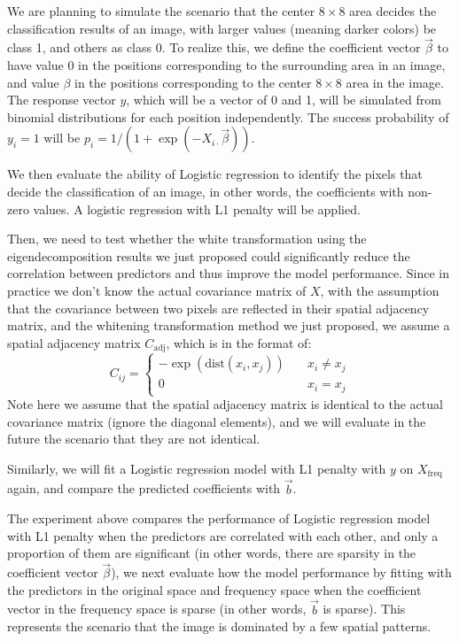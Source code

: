 \documentclass[12pt]{article}
\begin{document}
We are planning to simulate the scenario that the center \( 8 \times 8 \) area decides the classification results of an image, with larger values (meaning darker colors) be class 1, and others as class 0. To realize this, we define the coefficient vector \( \vec{\beta} \) to have value 0 in the positions corresponding to the surrounding area in an image, and value \( \beta \) in the positions corresponding to the center \( 8 \times 8 \) area in the image. The response vector \( y \), which will be a vector of 0 and 1, will be simulated from binomial distributions for each position independently. The success probability of \( y_i = 1 \) will be \( p_i = 1 / (1 + \exp (- X_{i \cdot} \vec{\beta})) \).

We then evaluate the ability of Logistic regression to identify the pixels that decide the classification of an image, in other words, the coefficients with non-zero values. A logistic regression with L1 penalty will be applied.

Then, we need to test whether the white transformation using the eigendecomposition results we just proposed could significantly reduce the correlation between predictors and thus improve the model performance. Since in practice we don't know the actual covariance matrix of \( X \), with the assumption that the covariance between two pixels are reflected in their spatial adjacency matrix, and the whitening transformation method we just proposed, we assume a spatial adjacency matrix \( C_{\text{adj}} \), which is in the format of:
\[
  C_{ij} = 
  \begin{cases}
    - \exp (\text{dist} (x_i, x_j))  & \quad x_i \neq x_j \\
    0                                & \quad x_i = x_j
  \end{cases}
\]
Note here we assume that the spatial adjacency matrix is identical to the actual covariance matrix (ignore the diagonal elements), and we will evaluate in the future the scenario that they are not identical.



Similarly, we will fit a Logistic regression model with L1 penalty with \( y \) on \( X_{\text{freq}} \) again, and compare the predicted coefficients with \( \vec{b} \).

The experiment above compares the performance of Logistic regression model with L1 penalty when the predictors are correlated with each other, and only a proportion of them are significant (in other words, there are sparsity in the coefficient vector \( \vec{\beta} \)), we next evaluate how the model performance by fitting with the predictors in the original space and frequency space when the coefficient vector in the frequency space is sparse (in other words, \( \vec{b} \) is sparse). This represents the scenario that the image is dominated by a few spatial patterns.
\end{document}
